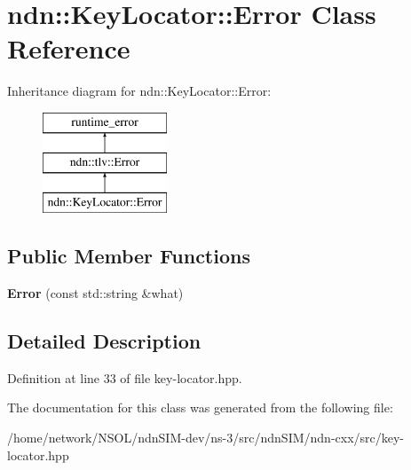 \hypertarget{classndn_1_1KeyLocator_1_1Error}{}\section{ndn\+:\+:Key\+Locator\+:\+:Error Class Reference}
\label{classndn_1_1KeyLocator_1_1Error}
Inheritance diagram for ndn\+:\+:Key\+Locator\+:\+:Error\+:\begin{figure}[H]
\begin{center}
\leavevmode
\includegraphics[height=3.000000cm]{classndn_1_1KeyLocator_1_1Error}
\end{center}
\end{figure}
\subsection*{Public Member Functions}
\begin{DoxyCompactItemize}
\item 
{\bfseries Error} (const std\+::string \&what)\hypertarget{classndn_1_1KeyLocator_1_1Error_a2b84cf23d8bd9a761f83161225560c5c}{}\label{classndn_1_1KeyLocator_1_1Error_a2b84cf23d8bd9a761f83161225560c5c}

\end{DoxyCompactItemize}


\subsection{Detailed Description}


Definition at line 33 of file key-\/locator.\+hpp.



The documentation for this class was generated from the following file\+:\begin{DoxyCompactItemize}
\item 
/home/network/\+N\+S\+O\+L/ndn\+S\+I\+M-\/dev/ns-\/3/src/ndn\+S\+I\+M/ndn-\/cxx/src/key-\/locator.\+hpp\end{DoxyCompactItemize}
